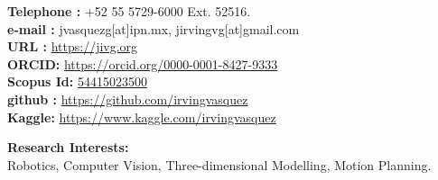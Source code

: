 \documentclass[10pt]{article}
\begin{document}
\begin{center}
\begin{minipage}[b]{0.6\linewidth}
			\textbf{Telephone \faPhone:} +52 55 5729-6000 Ext. 52516. \\
			\textbf{e-mail \faEnvelopeO:} jvasquezg[at]ipn.mx, jirvingvg[at]gmail.com\\
			\textbf{URL \faExternalLink:} \url{https://jivg.org} \\
			\textbf{ORCID:} \url{https://orcid.org/0000-0001-8427-9333} \\
			\textbf{Scopus Id:} \href{https://www.scopus.com/authid/detail.uri?authorId=54415023500}{54415023500}\\
			\textbf{github \faGithub :} \url{https://github.com/irvingvasquez} \\
			\textbf{Kaggle:} \url{https://www.kaggle.com/irvingvasquez}
		\end{minipage}
			
	\end{center}


\begin{center}
{\bf Research Interests:} \\ Robotics, Computer Vision, Three-dimensional Modelling, Motion Planning.
\end{center}
\end{document}
